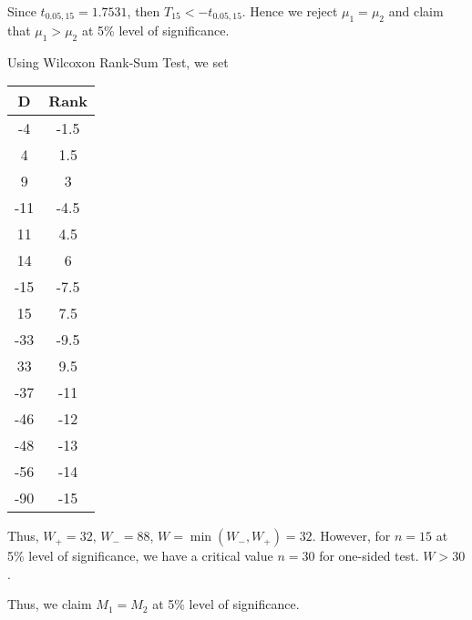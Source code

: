 Since $t_{0.05,15}=1.7531$, then $T_{15}<-t_{0.05,15}$. Hence we reject $\mu_1=\mu_2$ and claim that $\mu_1>\mu_2$ at 5\% level of significance.

Using Wilcoxon Rank-Sum Test, we set

\begin{table}[H]
    \centering
    \begin{tabular}{cc}\hline
        D & Rank\\\hline
        -4 & -1.5\\
        4 & 1.5\\
        9 & 3\\
        -11 & -4.5\\
        11 & 4.5\\
        14 & 6\\
        -15 & -7.5\\
        15 & 7.5\\
        -33 & -9.5\\
        33 & 9.5\\
        -37 & -11\\
        -46 & -12\\
        -48 & -13\\
        -56 & -14\\
        -90 & -15\\\hline
    \end{tabular}
\end{table}

Thus, $W_+=32$, $W_-=88$, $W=\min(W_-,W_+)=32$.
However, for $n=15$ at 5\% level of significance, we have a critical value $n=30$ for one-sided test. $W>30$.

Thus, we claim $M_1=M_2$ at 5\% level of significance.